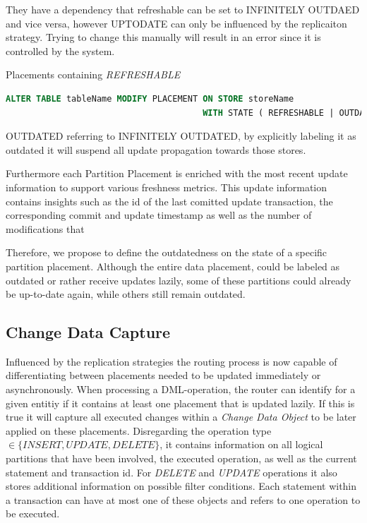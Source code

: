 They have a dependency that refreshable can be set to INFINITELY OUTDAED and vice versa, however UPTODATE can only be influenced by the replicaiton strategy.
Trying to change this manually will result in an error since it is controlled by the system.

Placements containing \emph{REFRESHABLE} 

\begin{lstlisting}[language=sql, caption={SQL Statement Syntax to change the designated Replication State of data placement.}]
ALTER TABLE tableName MODIFY PLACEMENT ON STORE storeName 
                                       WITH STATE ( REFRESHABLE | OUTDATED );
\end{lstlisting}
OUTDATED referring to INFINITELY OUTDATED, by explicitly labeling it as outdated it will suspend all update propagation towards those stores.

Furthermore each Partition Placement is enriched with the most recent update information to support various freshness metrics.
This update information contains insights such as the id of the last comitted update transaction, the corresponding commit and update timestamp as well as the number of 
modifications that 


Therefore, we propose to define the outdatedness on the state of a specific partition placement.
Although the entire data placement, could be labeled as outdated or rather receive updates lazily, some of 
these partitions could already be up-to-date again, while others still remain outdated.



\subsection{Change Data Capture}
\label{sec:cdc_impl}

Influenced by the replication strategies the routing process is now capable of differentiating between placements needed to be updated immediately or asynchronously. 
When processing a DML-operation, the router can identify for a given entitiy if it contains at least one placement that is updated lazily.
If this is true it will capture all executed changes within a \emph{Change Data Object} to be later applied on these placements. 
Disregarding the operation type $\in \{INSERT,UPDATE,DELETE\}$, it contains information on all logical partitions that have been involved, 
the executed operation, as well as the current statement and transaction id. For \emph{DELETE} and \emph{UPDATE} operations it also stores additional information on possible filter 
conditions. Each statement within a transaction can have at most one of these objects and refers to one operation to be executed.\\

